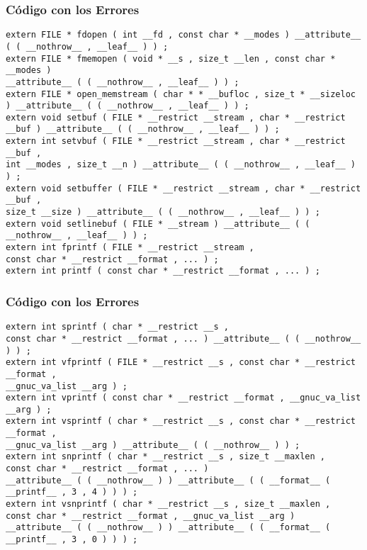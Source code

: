 \documentclass{beamer}
\begin{document}
\begin{frame}[fragile]
\frametitle{C\'odigo con los Errores}
\begin{lstlisting}[style=CStyle]
extern FILE * fdopen ( int __fd , const char * __modes ) __attribute__ ( ( __nothrow__ , __leaf__ ) ) ; 
extern FILE * fmemopen ( void * __s , size_t __len , const char * __modes ) 
__attribute__ ( ( __nothrow__ , __leaf__ ) ) ; 
extern FILE * open_memstream ( char * * __bufloc , size_t * __sizeloc ) __attribute__ ( ( __nothrow__ , __leaf__ ) ) ; 
extern void setbuf ( FILE * __restrict __stream , char * __restrict __buf ) __attribute__ ( ( __nothrow__ , __leaf__ ) ) ; 
extern int setvbuf ( FILE * __restrict __stream , char * __restrict __buf , 
int __modes , size_t __n ) __attribute__ ( ( __nothrow__ , __leaf__ ) ) ; 
extern void setbuffer ( FILE * __restrict __stream , char * __restrict __buf , 
size_t __size ) __attribute__ ( ( __nothrow__ , __leaf__ ) ) ; 
extern void setlinebuf ( FILE * __stream ) __attribute__ ( ( __nothrow__ , __leaf__ ) ) ; 
extern int fprintf ( FILE * __restrict __stream , 
const char * __restrict __format , ... ) ; 
extern int printf ( const char * __restrict __format , ... ) ; 
\end{lstlisting}
\end{frame}
\begin{frame}[fragile]
\frametitle{C\'odigo con los Errores}
\begin{lstlisting}[style=CStyle]
extern int sprintf ( char * __restrict __s , 
const char * __restrict __format , ... ) __attribute__ ( ( __nothrow__ ) ) ; 
extern int vfprintf ( FILE * __restrict __s , const char * __restrict __format , 
__gnuc_va_list __arg ) ; 
extern int vprintf ( const char * __restrict __format , __gnuc_va_list __arg ) ; 
extern int vsprintf ( char * __restrict __s , const char * __restrict __format , 
__gnuc_va_list __arg ) __attribute__ ( ( __nothrow__ ) ) ; 
extern int snprintf ( char * __restrict __s , size_t __maxlen , 
const char * __restrict __format , ... ) 
__attribute__ ( ( __nothrow__ ) ) __attribute__ ( ( __format__ ( __printf__ , 3 , 4 ) ) ) ; 
extern int vsnprintf ( char * __restrict __s , size_t __maxlen , 
const char * __restrict __format , __gnuc_va_list __arg ) 
__attribute__ ( ( __nothrow__ ) ) __attribute__ ( ( __format__ ( __printf__ , 3 , 0 ) ) ) ; 
\end{lstlisting}
\end{frame}
\end{document}
